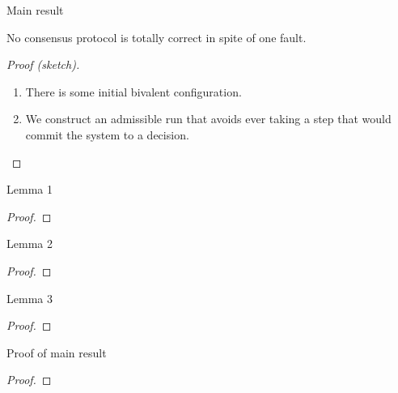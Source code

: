 \documentclass[12pt]{beamer}
\begin{document}
  \begin{frame}{Main result}
    \begin{theorem}
      No consensus protocol is totally correct in spite of one fault.
    \end{theorem}

    \begin{proof}[Proof (sketch)]
      \begin{enumerate}
        \item There is some initial bivalent configuration.
        \item We construct an admissible run that avoids ever taking a step that would commit the system to a decision.
      \end{enumerate}
    \end{proof}
  \end{frame}

  \begin{frame}{Lemma 1}
    \begin{lemma}
    \end{lemma}
    \begin{proof}
    \end{proof}
  \end{frame}

  \begin{frame}{Lemma 2}
    \begin{lemma}
    \end{lemma}
    \begin{proof}
    \end{proof}
  \end{frame}

  \begin{frame}{Lemma 3}
    \begin{lemma}
    \end{lemma}
    \begin{proof}
    \end{proof}
  \end{frame}

  \begin{frame}{Proof of main result}
    \begin{proof}
    \end{proof}
  \end{frame}
\end{document}
